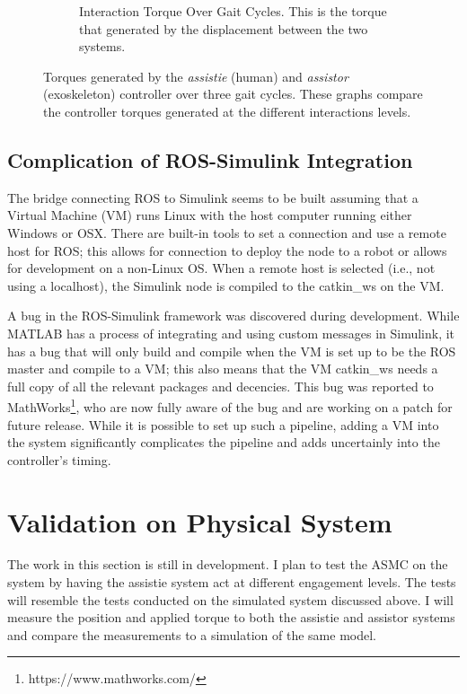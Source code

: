\begin{figure}
\begin{subfigure}{0.8\linewidth}
        \caption[Interaction Torque Over Gait Cycles]{Interaction Torque Over Gait Cycles. This is the torque that generated by the displacement between the two systems.}
        \label{fig:InteractionTripleGaitInteration}
    \end{subfigure}
    \caption[Comparison of Torques for Gait Cycle]{Torques generated by the \textit{assistie} (human) and  \textit{assistor} (exoskeleton) controller over three gait cycles. These graphs compare the controller torques generated at the different interactions levels. }
    \label{fig:TorqueOverGaitCycles}
\end{figure}




\subsection{Complication of ROS-Simulink Integration}

The bridge connecting ROS to Simulink seems to be built assuming that a Virtual Machine (VM) runs Linux with the host computer running either Windows or OSX. There are built-in tools to set a connection and use a remote host for ROS; this allows for connection to deploy the node to a robot or allows for development on a non-Linux OS. When a remote host is selected (i.e., not using a localhost), the Simulink node is compiled to the catkin\_ws on the VM. 

A bug in the ROS-Simulink framework was discovered during development. While MATLAB has a process of integrating and using custom messages in Simulink, it has a bug that will only build and compile when the VM is set up to be the ROS master and compile to a VM; this also means that the VM catkin\_ws needs a full copy of all the relevant packages and decencies. This bug was reported to MathWorks\footnote{https://www.mathworks.com/}, who are now fully aware of the bug and are working on a patch for future release. While it is possible to set up such a pipeline, adding a VM into the system significantly complicates the pipeline and adds uncertainly into the controller's timing. 



\section{Validation on Physical System}

The work in this section is still in development. I plan to test the ASMC on the system by having the assistie system act at different engagement levels. The tests will resemble the tests conducted on the simulated system discussed above. I will measure the position and applied torque to both the assistie and assistor systems and compare the measurements to a simulation of the same model.   


